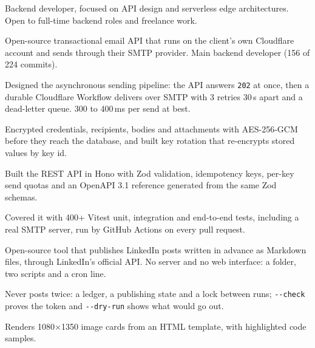 \documentclass[10pt]{article}
\begin{document}

Backend developer, focused on API design and serverless edge architectures.
Open to full-time backend roles and freelance work.

Open-source transactional email API that runs on the client's own Cloudflare account and sends
through their SMTP provider. Main backend developer (156 of 224 commits).
\begin{cvitems}
  \item Designed the asynchronous sending pipeline: the API answers \texttt{202} at once, then a
        durable Cloudflare Workflow delivers over SMTP with 3 retries 30\,s apart and a dead-letter
        queue. 300 to 400\,ms per send at best.
  \item Encrypted credentials, recipients, bodies and attachments with AES-256-GCM before they reach
        the database, and built key rotation that re-encrypts stored values by key id.
  \item Built the REST API in Hono with Zod validation, idempotency keys, per-key send quotas and an
        OpenAPI 3.1 reference generated from the same Zod schemas.
  \item Covered it with 400+ Vitest unit, integration and end-to-end tests, including a real SMTP
        server, run by GitHub Actions on every pull request.
\end{cvitems}

Open-source tool that publishes LinkedIn posts written in advance as Markdown files, through
LinkedIn's official API. No server and no web interface: a folder, two scripts and a cron line.
\begin{cvitems}
  \item Never posts twice: a ledger, a publishing state and a lock between runs; \texttt{-{}-check}
        proves the token and \texttt{-{}-dry-run} shows what would go out.
  \item Renders 1080$\times$1350 image cards from an HTML template, with highlighted code samples.
\end{cvitems}
\end{document}
